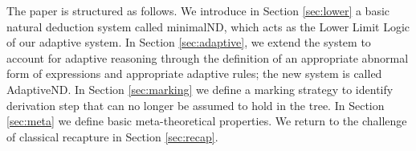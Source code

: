\documentclass[]{article}
\begin{document}
The paper is structured as follows. We introduce in Section \ref{sec:lower} a basic natural deduction system called {\sf minimalND}, which acts as the Lower Limit Logic of our adaptive system. In Section \ref{sec:adaptive}, we extend the system to account for adaptive reasoning through the definition of an appropriate abnormal form of expressions and appropriate adaptive rules; the new system is called {\sf AdaptiveND}. In Section \ref{sec:marking} we define a marking strategy to identify derivation step that can no longer be assumed to hold in the tree. In Section \ref{sec:meta} we define basic meta-theoretical properties. We return to the challenge of classical recapture in Section \ref{sec:recap}.





\end{document}
